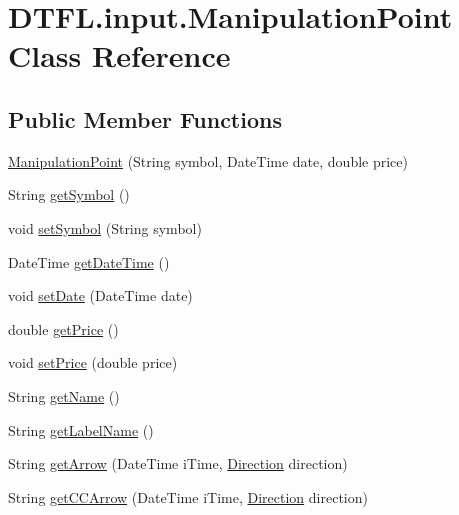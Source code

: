 \hypertarget{class_d_t_f_l_1_1input_1_1_manipulation_point}{}\section{D\+T\+F\+L.\+input.\+Manipulation\+Point Class Reference}
\label{class_d_t_f_l_1_1input_1_1_manipulation_point}
\subsection*{Public Member Functions}
\begin{DoxyCompactItemize}
\item 
\hyperlink{class_d_t_f_l_1_1input_1_1_manipulation_point_aaa040bf01929d9554152420af21ea470}{Manipulation\+Point} (String symbol, Date\+Time date, double price)
\item 
String \hyperlink{class_d_t_f_l_1_1input_1_1_manipulation_point_a63c4099bfc4e0539513f3d363cd75233}{get\+Symbol} ()
\item 
void \hyperlink{class_d_t_f_l_1_1input_1_1_manipulation_point_abef6ee253220a45cf35a681e547469fd}{set\+Symbol} (String symbol)
\item 
Date\+Time \hyperlink{class_d_t_f_l_1_1input_1_1_manipulation_point_a10492f54f8800e90bb418820a3998fda}{get\+Date\+Time} ()
\item 
void \hyperlink{class_d_t_f_l_1_1input_1_1_manipulation_point_a4896490f8ffe379d3e598045313286d3}{set\+Date} (Date\+Time date)
\item 
double \hyperlink{class_d_t_f_l_1_1input_1_1_manipulation_point_ab900e45716acc1680da55f60742179b6}{get\+Price} ()
\item 
void \hyperlink{class_d_t_f_l_1_1input_1_1_manipulation_point_a4e9340fc2931beb9a2f1c7201ef08d1c}{set\+Price} (double price)
\item 
String \hyperlink{class_d_t_f_l_1_1input_1_1_manipulation_point_af609dc55f2df591d7235b0c3436a8aa7}{get\+Name} ()
\item 
String \hyperlink{class_d_t_f_l_1_1input_1_1_manipulation_point_a05dc844729985773371be9ce7826c218}{get\+Label\+Name} ()
\item 
String \hyperlink{class_d_t_f_l_1_1input_1_1_manipulation_point_a6dc63dcc0ab8b9064101ee21f4db4058}{get\+Arrow} (Date\+Time i\+Time, \hyperlink{namespace_m_q_l4_c_sharp_1_1_base_1_1_enums_a8bd45b58389fa72ba1d4e8a192f17510}{Direction} direction)
\item 
String \hyperlink{class_d_t_f_l_1_1input_1_1_manipulation_point_af6de3ef73c601526355e491afded7f76}{get\+C\+C\+Arrow} (Date\+Time i\+Time, \hyperlink{namespace_m_q_l4_c_sharp_1_1_base_1_1_enums_a8bd45b58389fa72ba1d4e8a192f17510}{Direction} direction)

\end{DoxyCompactItemize}
